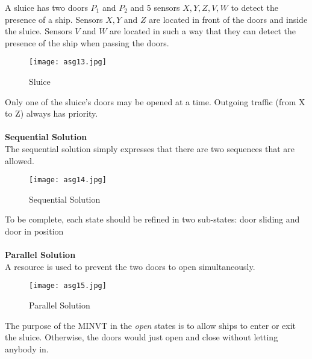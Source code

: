 \documentclass[../main.tex]{subfiles}
\begin{document}
\begin{exmp}
A sluice has two doors $P_1$ and $P_2$ and 5 sensors $X,Y,Z,V,W$ to detect the presence of a ship. Sensors  $X, Y$ and $Z$ are located in front of the doors and inside the sluice. Sensors $V$ and $W$ are located in such a way that they can detect the presence of the ship when passing the doors.

\begin{figure}[H]
    \centering
    \texttt{[image: asg13.jpg]}
    \caption{Sluice}
    \label{asg13}
\end{figure}
Only one of the sluice's doors may be opened at a time. Outgoing traffic (from X to Z) always has priority.
\\\\
\textbf{Sequential Solution}\\
The sequential solution simply expresses that there are two sequences that are allowed.
\begin{figure}[H]
    \centering
    \texttt{[image: asg14.jpg]}
    \caption{Sequential Solution}
    \label{asg14}
\end{figure}
To be complete, each state should be refined in two sub-states: door sliding and door in position
\\\\
\textbf{Parallel Solution} \\
A resource is used to prevent the two doors to open simultaneously.
\begin{figure}[H]
    \centering
    \texttt{[image: asg15.jpg]}
    \caption{Parallel Solution}
    \label{asg15}
\end{figure}
The purpose of the MINVT in the \textit{open} states is to allow ships to enter or exit the sluice. Otherwise, the doors would just open and close without letting anybody in.
\end{exmp}
\end{document}
